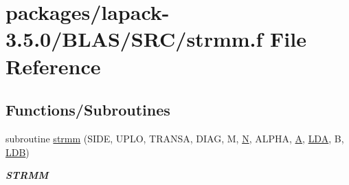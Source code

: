 \hypertarget{lapack-3_85_80_2BLAS_2SRC_2strmm_8f}{}\section{packages/lapack-\/3.5.0/\+B\+L\+A\+S/\+S\+R\+C/strmm.f File Reference}
\label{lapack-3_85_80_2BLAS_2SRC_2strmm_8f}
\subsection*{Functions/\+Subroutines}
\begin{DoxyCompactItemize}
\item 
subroutine \hyperlink{group__single__blas__level3_ga5a8ec25aba550c224cf6941fca7a2c98}{strmm} (S\+I\+D\+E, U\+P\+L\+O, T\+R\+A\+N\+S\+A, D\+I\+A\+G, M, \hyperlink{polmisc_8c_a0240ac851181b84ac374872dc5434ee4}{N}, A\+L\+P\+H\+A, \hyperlink{classA}{A}, \hyperlink{example__user_8c_ae946da542ce0db94dced19b2ecefd1aa}{L\+D\+A}, B, \hyperlink{example__user_8c_a50e90a7104df172b5a89a06c47fcca04}{L\+D\+B})
\begin{DoxyCompactList}\small\item\em {\bfseries S\+T\+R\+M\+M} \end{DoxyCompactList}\end{DoxyCompactItemize}
